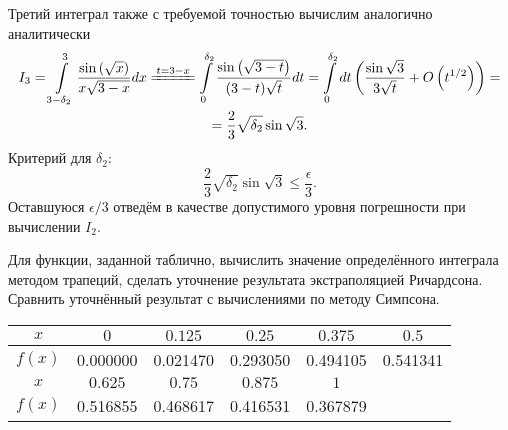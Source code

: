 \documentclass[a4paper]{article}
\begin{document}
\begin{sol}
Третий интеграл также с требуемой точностью  вычислим аналогично
аналитически
\begin{multline*}
	I_3=\int\limits_{3-\delta_2}^{3} \frac{\sin\left( \sqrt{x}  \right) }{x\sqrt{3-x} }dx \xlongequal[]{t=3-x} 
	\int\limits_{0}^{\delta_2} \frac{\sin\left( 
	\sqrt{3-t} \right) }{(3-t)\sqrt{t} }dt =
	\int\limits_{0}^{\delta_2} dt\left(\frac{\sin \sqrt{3}   }{3\sqrt{t} }+O\left(t^{1 /2}\right) \right)=\\=
	\frac{2}{3} \sqrt{\delta_2} \sin \sqrt{3} 
.\end{multline*}
Критерий для $\delta_2$:
\[
\frac{2}{3}\sqrt{\delta_2} \sin\sqrt{3} \le \frac{\epsilon}{3}
.\] 
Оставшуюся $\epsilon /3$ отведём в качестве допустимого уровня
погрешности  при вычислении $I_2$.
\end{sol}
\begin{hiProb}[9.5б]
Для функции, заданной таблично, вычислить значение определённого
интеграла методом трапеций, сделать уточнение результата
экстраполяцией Ричардсона. Сравнить уточнённый результат с
вычислениями по методу Симпсона.
\begin{table}[htpb]
	\centering
	\label{tab:95}
	\begin{tabular}{|c|c|c|c|c|c|}
		\hline
	 $x$& $0$ & $0.125$ & $0.25$ & $0.375$ &$0.5$   \\ \hline
	 $f(x)$  &0.000000& 0.021470 &0.293050  & 0.494105 &0.541341  \\\hline
	 $x$&$0.625$  &$0.75$  & $0.875$ & $1$&\\ \hline
$f(x)$ & 
0.516855&0.468617  & 0.416531 &0.367879&  \\ \hline
	\end{tabular}
\end{table}
\end{hiProb}
\end{document}

